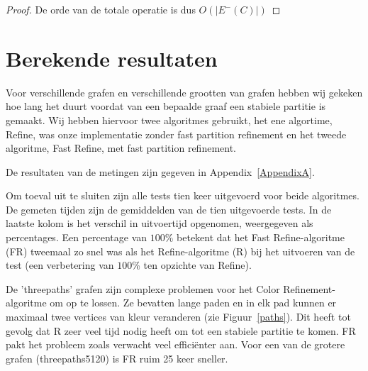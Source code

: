 \documentclass[twoside]{article}
\begin{document}
\begin{multicols}{2}
\begin{proof}
De orde van de totale operatie is dus $O(|E^{-}(C)|)$
\end{proof}


\section{Berekende resultaten}

Voor verschillende grafen en verschillende grootten van grafen hebben wij gekeken hoe lang het duurt voordat van een bepaalde graaf een stabiele partitie is gemaakt. Wij hebben hiervoor twee algoritmes gebruikt, het ene algortime, Refine, was onze implementatie zonder fast partition refinement en het tweede algoritme, Fast Refine, met fast partition refinement.

De resultaten van de metingen zijn gegeven in Appendix~\ref{AppendixA}.

Om toeval uit te sluiten zijn alle tests tien keer uitgevoerd voor beide algoritmes. De gemeten tijden zijn de gemiddelden van de tien uitgevoerde tests. In de laatste kolom is het verschil in uitvoertijd opgenomen, weergegeven als percentages. Een percentage van $100\%$ betekent dat het Fast Refine-algoritme (FR) tweemaal zo snel was als het Refine-algoritme (R) bij het uitvoeren van de test (een verbetering van $100$\% ten opzichte van Refine).

De 'threepaths' grafen zijn complexe problemen voor het Color Refinement-algoritme om op te lossen. Ze bevatten lange paden en in elk pad kunnen er maximaal twee vertices van kleur veranderen (zie Figuur~\ref{paths}). Dit heeft tot gevolg dat R zeer veel tijd nodig heeft om tot een stabiele partitie te komen. FR pakt het probleem zoals verwacht veel effici\"enter aan. Voor een van de grotere grafen (threepaths5120) is FR ruim 25 keer sneller.


\end{multicols}
\end{document}
